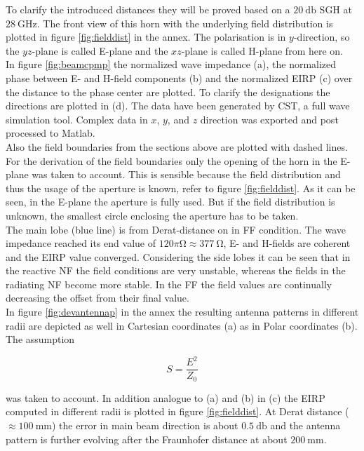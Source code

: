 To clarify the introduced distances they will be proved based on a $\SI{20}{\decibel}$ \ac{SGH} at $\SI{28}{\giga\hertz}$. The front view of this horn with the underlying field distribution is plotted in figure \ref{fig:fielddist} in the annex. The polarisation is in $y$-direction, so the $yz$-plane is called E-plane and the $xz$-plane is called H-plane from here on.\\
In figure \ref{fig:beamcpmp} the normalized wave impedance (a), the normalized phase between E- and H-field components (b) and the normalized \ac{EIRP} (c) over the distance to the phase center are plotted. To clarify the designations the directions are plotted in (d). The data have been generated by CST\texttrademark , a full wave simulation tool. Complex data in $x$, $y$, and $z$ direction was exported and post processed to Matlab\texttrademark{}.\\
Also the field boundaries from the sections above are plotted with dashed lines. For the derivation of the field boundaries only the opening of the horn in the E-plane was taken to account. This is sensible because the field distribution and thus the usage of the aperture is known, refer to figure \ref{fig:fielddist}. As it can be seen, in the E-plane the aperture is fully used. But if the field distribution is unknown, the smallest circle enclosing the aperture has to be taken.\\
The main lobe (blue line) is from Derat-distance on in \ac{FF} condition. The wave impedance reached its end value of $120\pi\si{\ohm}\approx\SI{377}{\ohm}$, E- and H-fields are coherent and the \ac{EIRP} value converged. Considering the side lobes it can be seen that in the reactive \ac{NF} the field conditions are very unstable, whereas the fields in the radiating \ac{NF} become more stable. In the \ac{FF} the field values are continually decreasing the offset from their final value.\\
In figure \ref{fig:devantennap} in the annex the resulting antenna patterns in different radii are depicted as well in Cartesian coordinates (a) as in Polar coordinates (b). The assumption 

\begin{equation}
S = \frac{E^2}{Z_0}
\label{eq:poynting}
\end{equation}

was taken to account. In addition analogue to (a) and (b) in (c) the \ac{EIRP} computed in different radii is plotted in figure \ref{fig:fielddist}. At Derat distance ($\approx\SI{100}{\milli\meter}$) the error in main beam direction is about $\SI{0.5}{\decibel}$ and the antenna pattern is further evolving after the Fraunhofer distance at about $\SI{200}{\milli\meter}$.

